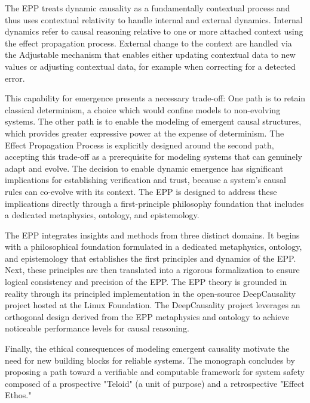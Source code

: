 The EPP treats dynamic causality as a fundamentally contextual process and thus uses contextual relativity to handle internal and external dynamics.
Internal dynamics refer to causal reasoning relative to one or more attached context using the effect propagation process.
External change to the context are handled via the Adjustable mechanism that enables either updating contextual data to new values or adjusting contextual data,
for example when correcting for a detected error.

This capability for emergence presents a necessary trade-off: One path is to retain classical determinism, a choice which would confine models to non-evolving systems.
The other path is to enable the modeling of emergent causal structures, which provides greater expressive power at the expense of determinism.
The Effect Propagation Process is explicitly designed around the second path, accepting this trade-off as a prerequisite for modeling systems that can genuinely adapt and evolve.
The decision to enable dynamic emergence has significant implications for establishing verification and trust, because a system’s causal rules can co-evolve with its context.
The EPP is designed to address these implications directly through a first-principle philosophy foundation that includes a dedicated metaphysics, ontology, and epistemology.

The EPP integrates insights and methods from three distinct domains. It begins with a philosophical foundation formulated
in a dedicated metaphysics, ontology, and epistemology that establishes the first principles and dynamics of the EPP.
Next, these principles are then translated into a rigorous formalization to ensure logical consistency and precision of the EPP.
The EPP theory is grounded in reality through its principled implementation in the open-source
DeepCausality project hosted at the Linux Foundation. The DeepCausality project leverages an orthogonal
design derived from the EPP metaphysics and ontology to achieve noticeable performance levels for causal reasoning.

Finally, the ethical consequences of modeling emergent causality motivate the need for new building blocks for reliable systems.
The monograph concludes by proposing a path toward a verifiable and computable framework for system safety composed
of a prospective "Teloid" (a unit of purpose) and a retrospective "Effect Ethos."

\newpage